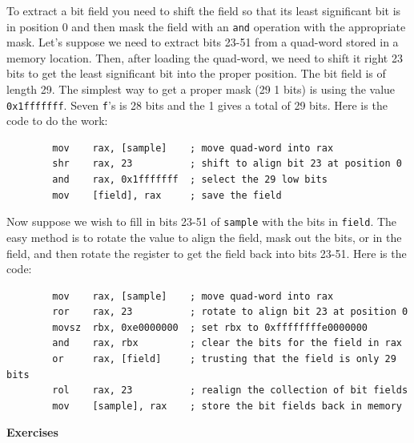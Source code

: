 \documentclass[11pt,b5paper]{book}
\begin{document}
To extract a bit field you need to shift the field so that its least significant bit is in position 0 and then  mask the field with an {\tt and} operation with the appropriate mask.  Let's suppose we need to extract bits 23-51 from a quad-word stored in a memory location.
Then, after loading the quad-word, we need to shift it right 23 bits to get the least significant bit into the proper position.
The bit field is of length 29.
The simplest way to get a proper mask (29 1 bits) is using the value {\tt 0x1fffffff}.  Seven {\tt f}'s is 28 bits and the 1 gives a total of 29 bits.
Here is the code to do the work:
\begin{verbatim}
        mov    rax, [sample]    ; move quad-word into rax
        shr    rax, 23          ; shift to align bit 23 at position 0
        and    rax, 0x1fffffff  ; select the 29 low bits
        mov    [field], rax     ; save the field
\end{verbatim}

Now suppose we wish to fill in bits 23-51 of {\tt sample} with the bits in {\tt field}.
The easy method is to rotate the value to align the field, mask out the bits, or in the field,
and then rotate the register to get the field back into bits 23-51.
Here is the code:

\begin{verbatim}
        mov    rax, [sample]    ; move quad-word into rax
        ror    rax, 23          ; rotate to align bit 23 at position 0
        movsz  rbx, 0xe0000000  ; set rbx to 0xffffffffe0000000
        and    rax, rbx         ; clear the bits for the field in rax
        or     rax, [field]     ; trusting that the field is only 29 bits
        rol    rax, 23          ; realign the collection of bit fields
        mov    [sample], rax    ; store the bit fields back in memory
\end{verbatim}

\vfill
\break
{\bf\large Exercises}
\end{document}
